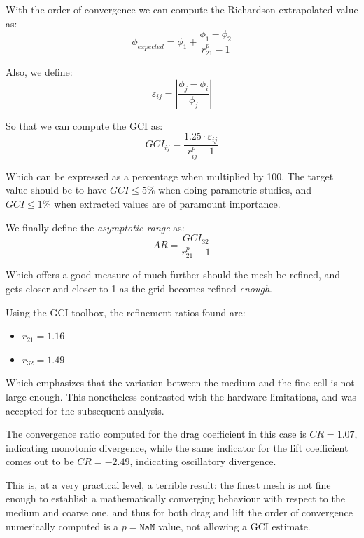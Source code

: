 \documentclass[12pt,a4paper]{article}
\begin{document}
With the order of convergence we can compute the Richardson extrapolated value as:
\begin{equation}
    \phi_{expected} = \phi_1 + \frac{\phi_1 - \phi_2}{r_{21}^p - 1}
\end{equation}

Also, we define:
\begin{equation}
    \varepsilon_{ij}=|\frac{\phi_j - \phi_i}{\phi_j}|
\end{equation}

So that we can compute the GCI as:
\begin{equation}
    GCI_{ij} = \frac{1.25\cdot\varepsilon_{ij}}{r_{ij}^p-1}
\end{equation}

Which can be expressed as a percentage when multiplied by 100. The target value should be to have $GCI\leq5\%$ when doing parametric studies, and $GCI\leq1\%$ when extracted values are of paramount importance.

We finally define the \textit{asymptotic range} as:
\begin{equation}
    AR = \frac{GCI_{32}}{r_{21}^p-1}
\end{equation}

Which offers a good measure of much further should the mesh be refined, and gets closer and closer to 1 as the grid becomes refined \textit{enough}.

Using the GCI toolbox, the refinement ratios found are:

\begin{itemize}
    \item $r_{21} = 1.16$
    \item $r_{32} = 1.49$
\end{itemize}
Which emphasizes that the variation between the medium and the fine cell is not large enough. This nonetheless contrasted with the hardware limitations, and was accepted for the subsequent analysis.

The convergence ratio computed for the drag coefficient in this case is $CR=1.07$, indicating monotonic divergence, while the same indicator for the lift coefficient comes out to be $CR=-2.49$, indicating oscillatory divergence.

This is, at a very practical level, a terrible result: the finest mesh is not fine enough to establish a mathematically converging behaviour with respect to the medium and coarse one, and thus for both drag and lift the order of convergence numerically computed is a $p=\texttt{NaN}$ value, not allowing a GCI estimate.
\end{document}
